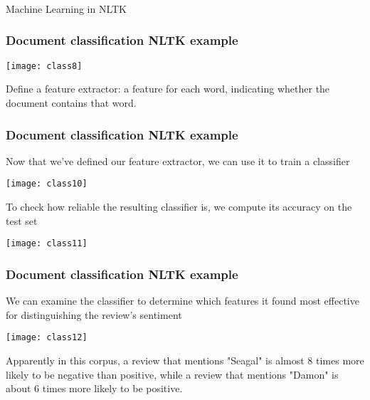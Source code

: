 \begin{frame}[fragile]\frametitle{}

\begin{center}
{\Large Machine Learning in NLTK}
\end{center}
\end{frame}

\begin{frame}[fragile]
\frametitle{Document classification NLTK example}
\begin{center}
\texttt{[image: class8]}
\end{center}
Define a feature extractor: a feature for each word, indicating whether the document contains that word. 
\end{frame}

\begin{frame}[fragile]
\frametitle{Document classification NLTK example}
Now that we've defined our feature extractor, we can use it to train a classifier
\begin{center}
\texttt{[image: class10]}
\end{center}
To check how reliable the resulting classifier is, we compute its accuracy on the test set 

\begin{center}
\texttt{[image: class11]}
\end{center}
\end{frame}

\begin{frame}[fragile]
\frametitle{Document classification NLTK example}
We can examine the classifier to determine which features it found most effective for distinguishing the review’s sentiment 

\begin{center}
\texttt{[image: class12]}
\end{center}
Apparently in this corpus, a review that mentions "Seagal" is almost 8 times more likely to be negative than positive, while a review that mentions "Damon" is about 6 times more likely to be positive.


\end{frame}


